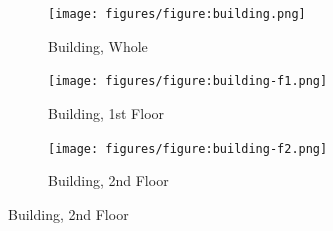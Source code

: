 \documentclass[preprint,12pt]{elsarticle}
\begin{document}
\begin{figure}[htbp]
    \centering
    \begin{subfigure}[b]{0.3\textwidth}
        \centering
        \texttt{[image: figures/figure:building.png]}
        \caption{Building, Whole}
    \end{subfigure}
    \begin{subfigure}[b]{0.3\textwidth}
        \centering
        \texttt{[image: figures/figure:building-f1.png]}
        \caption{Building, 1st Floor}
    \end{subfigure}
    \begin{subfigure}[b]{0.3\textwidth}
        \centering
        \texttt{[image: figures/figure:building-f2.png]}
        \caption{Building, 2nd Floor}
    \end{subfigure}
\end{figure}



\end{document}
